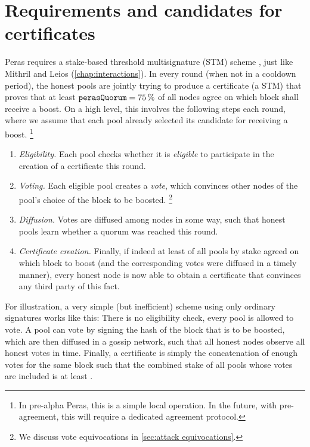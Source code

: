 \chapter{Requirements and candidates for certificates}\label{chap:req cands certs}

Peras requires a stake-based threshold multisignature (STM) scheme \parencite{chaidos2024mithril}, just like Mithril and Leios (\cref{chap:interactions}).
In every round (when not in a cooldown period), the honest pools are jointly trying to produce a certificate (a STM) that proves that at least $\mathtt{perasQuorum} = \qty{75}{\percent}$ of all nodes agree on which block shall receive a boost.
On a high level, this involves the following steps each round, where we assume that each pool already selected its candidate for receiving a boost.%
\footnote{In pre-alpha Peras, this is a simple local operation. In the future, with pre-agreement, this will require a dedicated agreement protocol.}
\begin{enumerate}
\item
  \emph{Eligibility.}
  Each pool checks whether it is \emph{eligible} to participate in the creation of a certificate this round.
\item
  \emph{Voting.}
  Each eligible pool creates a \emph{vote}, which convinces other nodes of the pool's choice of the block to be boosted.%
  \footnote{We discuss vote equivocations in \cref{sec:attack equivocations}.}
\item
  \emph{Diffusion.}
  Votes are diffused among nodes in some way, such that honest pools learn whether a quorum was reached this round.
\item
  \emph{Certificate creation.}
  Finally, if indeed at least \perasQuorum{} of all pools by stake agreed on which block to boost (and the corresponding votes were diffused in a timely manner), every honest node is now able to obtain a certificate that convinces any third party of this fact.
\end{enumerate}

For illustration, a very simple (but inefficient) scheme using only ordinary signatures works like this:
There is no eligibility check, every pool is allowed to vote.
A pool can vote by signing the hash of the block that is to be boosted, which are then diffused in a gossip network, such that all honest nodes observe all honest votes in time.
Finally, a certificate is simply the concatenation of enough votes for the same block such that the combined stake of all pools whose votes are included is at least \perasQuorum{}.

